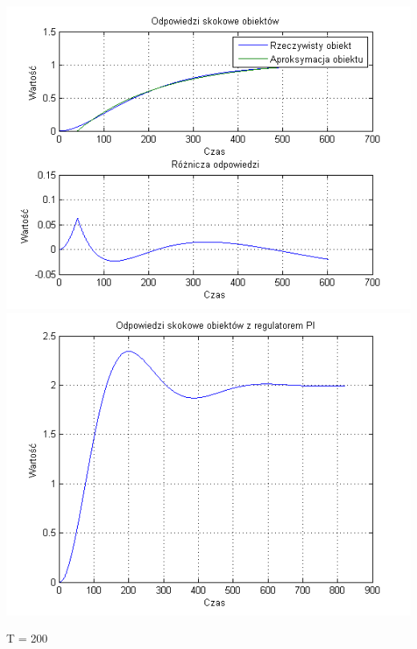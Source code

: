 \documentclass[10pt,a4paper]{article}
\begin{document}
\begin{center}
\includegraphics[scale=1]{images/jeden/skrypt_79.png}\\
\includegraphics[scale=1]{images/jeden/skrypt_80.png}\\
\end{center}
\newpage
T = 200
\end{document}
